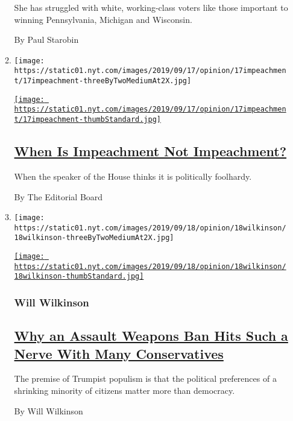 \begin{enumerate}
\begin{enumerate}
    She has struggled with white, working-class voters like those
    important to winning Pennsylvania, Michigan and Wisconsin.

    By Paul Starobin
  \item
    \texttt{[image: https://static01.nyt.com/images/2019/09/17/opinion/17impeachment/17impeachment-threeByTwoMediumAt2X.jpg]}

    \href{/2019/09/17/opinion/impeachment-trump.html}{\texttt{[image: https://static01.nyt.com/images/2019/09/17/opinion/17impeachment/17impeachment-thumbStandard.jpg]}}

    \hypertarget{when-is-impeachment-not-impeachment}{%
    \subsection{\texorpdfstring{\href{/2019/09/17/opinion/impeachment-trump.html}{When
    Is Impeachment Not
    Impeachment?}}{When Is Impeachment Not Impeachment?}}\label{when-is-impeachment-not-impeachment}}

    When the speaker of the House thinks it is politically foolhardy.

    By The Editorial Board
  \item
    \texttt{[image: https://static01.nyt.com/images/2019/09/18/opinion/18wilkinson/18wilkinson-threeByTwoMediumAt2X.jpg]}

    \href{/2019/09/18/opinion/assault-rifle-ban.html}{\texttt{[image: https://static01.nyt.com/images/2019/09/18/opinion/18wilkinson/18wilkinson-thumbStandard.jpg]}}

    \hypertarget{will-wilkinson}{%
    \subsubsection{Will Wilkinson}\label{will-wilkinson}}

    \hypertarget{why-an-assault-weapons-ban-hits-such-a-nerve-with-many-conservatives}{%
    \subsection{\texorpdfstring{\href{/2019/09/18/opinion/assault-rifle-ban.html}{Why
    an Assault Weapons Ban Hits Such a Nerve With Many
    Conservatives}}{Why an Assault Weapons Ban Hits Such a Nerve With Many Conservatives}}\label{why-an-assault-weapons-ban-hits-such-a-nerve-with-many-conservatives}}

    The premise of Trumpist populism is that the political preferences
    of a shrinking minority of citizens matter more than democracy.

    By Will Wilkinson
  \end{enumerate}
\end{enumerate}

